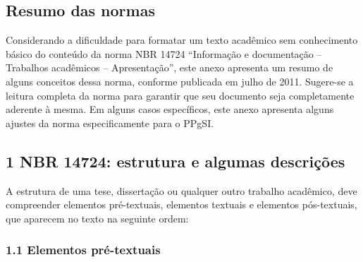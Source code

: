 \documentclass[
	12pt,				%
	oneside,			%
	a4paper,			%
	english,			%
	brazil				%
	]{abntex2ppgsi}
\begin{document}
\begin{anexosenv}



%
%
%
\chapter{Resumo das normas}
\label{anexoA}

Considerando a dificuldade para formatar um texto acadêmico sem conhecimento básico do conteúdo da norma NBR 14724 ``Informação e documentação – Trabalhos acadêmicos – Apresentação'', este anexo apresenta um resumo de alguns conceitos dessa norma, conforme publicada em julho de 2011. Sugere-se a leitura completa da norma para garantir que seu documento seja completamente aderente à mesma. Em alguns casos específicos, este anexo apresenta alguns ajustes da norma especificamente para o PPgSI.

\section*{1 NBR 14724: estrutura e algumas descrições}

A estrutura de uma tese, dissertação ou qualquer outro trabalho acadêmico, deve compreender elementos pré-textuais, elementos textuais e elementos pós-textuais, que aparecem no texto na seguinte ordem:

\subsection*{1.1 Elementos pré-textuais}


\end{anexosenv}
\end{document}
